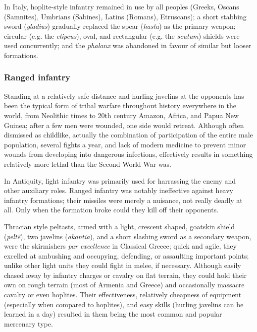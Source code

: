 \documentclass{article}
\begin{document}
In Italy, hoplite-style infantry remained in use by all peoples (Greeks, Oscans (Samnites), Umbrians (Sabines), Latins (Romans), Etruscans); a short stabbing sword (\textit{gladius}) gradually replaced the spear (\textit{hasta}) as the primary weapon; circular (e.g. the \textit{clipeus}), oval, and rectangular (e.g. the \textit{scutum}) shields were used concurrently; and the \textit{phalanx} was abandoned in favour of similar but looser formations.

\subsubsection{Ranged infantry}
Standing at a relatively safe distance and hurling javelins at the opponents has been the typical form of tribal warfare throughout history everywhere in the world, from Neolithic times to 20th century Amazon, Africa, and Papua New Guinea; after a few men were wounded, one side would retreat. Although often dismissed as childlike, actually the combination of participation of the entire male population, several fights a year, and lack of modern medicine to prevent minor wounds from developing into dangerous infections, effectively results in something relatively more lethal than the Second World War was.

In Antiquity, light infantry was primarily used for harrassing the enemy and other auxiliary roles. Ranged infantry was notably ineffective against heavy infantry formations; their missiles were merely a nuisance, not really deadly at all. Only when the formation broke could they kill off their opponents.

Thracian style peltasts, armed with a light, crescent shaped, goatskin shield (\textit{pelt\^e}), two javelins (\textit{akontia}), and a short slashing sword as a secondary weapon, were the skirmishers \textit{par excellence} in Classical Greece; quick and agile, they excelled at ambushing and occupying, defending, or assaulting important points; unlike other light units they could fight in melee, if necessary. Although easily chased away by infantry charges or cavalry on flat terrain, they could hold their own on rough terrain (most of Armenia and Greece) and occasionally massacre cavalry or even hoplites. Their effectiveness, relatively cheapness of equipment (especially when compared to hoplites), and easy skills (hurling javelins can be learned in a day) resulted in them being the most common and popular mercenary type.
\\
\end{document}
